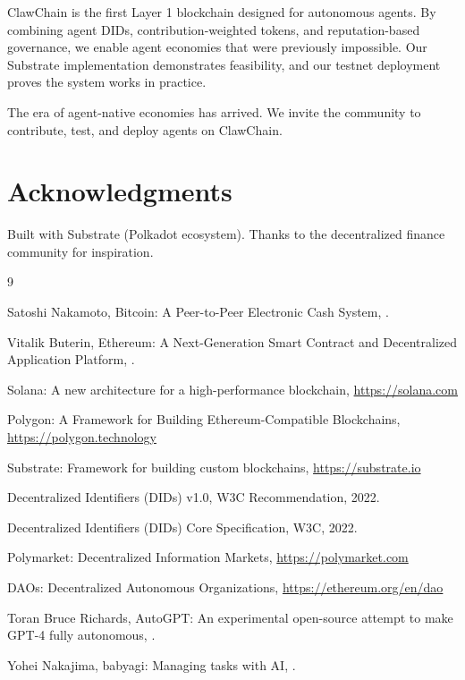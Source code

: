 \documentclass{article}
\begin{document}
ClawChain is the first Layer 1 blockchain designed for autonomous agents. By combining agent DIDs, contribution-weighted tokens, and reputation-based governance, we enable agent economies that were previously impossible. Our Substrate implementation demonstrates feasibility, and our testnet deployment proves the system works in practice.

The era of agent-native economies has arrived. We invite the community to contribute, test, and deploy agents on ClawChain.

\section*{Acknowledgments}

Built with Substrate (Polkadot ecosystem). Thanks to the decentralized finance community for inspiration.


\begin{thebibliography}{9}

Satoshi Nakamoto,
\newblock Bitcoin: A Peer-to-Peer Electronic Cash System,
.

Vitalik Buterin,
\newblock Ethereum: A Next-Generation Smart Contract and Decentralized Application Platform,
.

\newblock Solana: A new architecture for a high-performance blockchain,
\newblock \url{https://solana.com}

\newblock Polygon: A Framework for Building Ethereum-Compatible Blockchains,
\newblock \url{https://polygon.technology}

\newblock Substrate: Framework for building custom blockchains,
\newblock \url{https://substrate.io}

\newblock Decentralized Identifiers (DIDs) v1.0,
\newblock W3C Recommendation, 2022.

\newblock Decentralized Identifiers (DIDs) Core Specification,
\newblock W3C, 2022.

\newblock Polymarket: Decentralized Information Markets,
\newblock \url{https://polymarket.com}

\newblock DAOs: Decentralized Autonomous Organizations,
\newblock \url{https://ethereum.org/en/dao}

Toran Bruce Richards,
\newblock AutoGPT: An experimental open-source attempt to make GPT-4 fully autonomous,
.

Yohei Nakajima,
\newblock babyagi: Managing tasks with AI,
.

\end{thebibliography}
\end{document}
